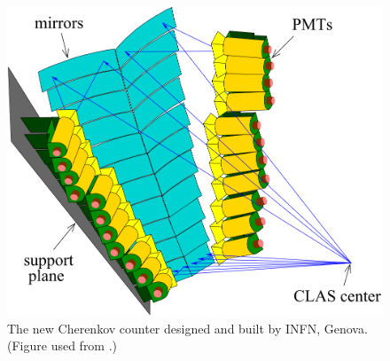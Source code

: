 \begin{figure}[h] %
\centering
\leavevmode \includegraphics[width=1.0\textwidth]{figuresEG4/FigExp/newCCsnapshotFromXZhengPRC_94_045206.png}  %
\caption[New Cherenkov counter]{The new Cherenkov counter designed and built by INFN, Genova. (Figure used from \cite{PhysRevC.94.045206}.) }
\label{nwCcCAD}
\end{figure}




